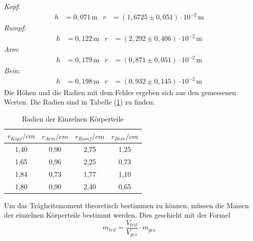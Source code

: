 \emph{Kopf}:
\begin{align*}
h &= 0,071 \, \mathrm{m} & r &= (1,6725 \pm 0,051) \cdot 10^{-2} \, \mathrm{m}
\end{align*}
\emph{Rumpf}:
\begin{align*}
h &= 0,122 \, \mathrm{m} & r &= (2,292 \pm 0,406) \cdot 10^{-2} \, \mathrm{m}
\end{align*}
\emph{Arm}:
\begin{align*}
h &= 0,179 \, \mathrm{m} & r &= (0,871 \pm 0,051) \cdot 10^{-2} \, \mathrm{m}
\end{align*}
\emph{Bein}:
\begin{align*}
h &= 0,198 \, \mathrm{m} & r &= (0,932 \pm 0,145) \cdot 10^{-2} \, \mathrm{m}
\end{align*}
Die Höhen und die Radien mit dem Fehler ergeben sich aus den gemessenen Werten.
Die Radien sind in Tabelle (\ref{tab:rad}) zu finden.
\begin{table}[H]
  \centering
  \caption{Radien der Einzelnen Körperteile}
  \label{tab:rad}
  \begin{tabular}{c c c c}
\toprule
$r_{Kopf}/cm$ & $r_{Arm}/cm$ & $r_{Rumf}/cm$ & $r_{Bein}/cm$ \\
\midrule
1,40 & 0,90 & 2,75 & 1,25 \\
1,65 & 0,96 & 2,25 & 0,73 \\
1,84 & 0,73 & 1,77 & 1,10 \\
1,80 & 0,90 & 2,40 & 0,65 \\
\bottomrule
\end{tabular}
\end{table}
Um das Trägheitsmoment theoretisch bestimmen zu können, müssen die Massen der einzelnen Körperteile bestimmt werden.
Dies geschieht mit der Formel
\begin{equation*}
m_{teil}= \frac{V_{teil}}{V_{ges}}\cdot m_{ges}
\end{equation*}

